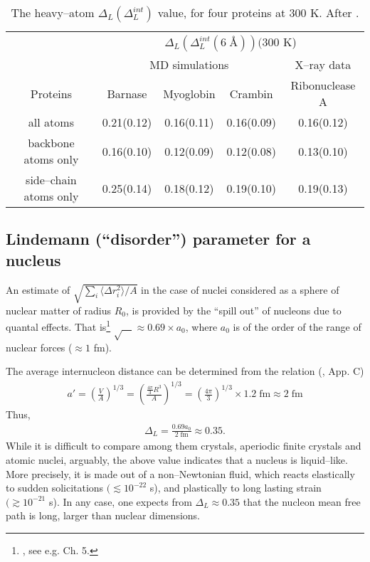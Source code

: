 \documentclass[a4paper,11pt]{book}
\begin{document}
\begin{table}[h]
 \begin{tabular}{|c|c|c|c|c|}
 \hline
 &\multicolumn{4}{|c|}{$\Delta_L(\Delta_L^{int}(6\;\text{\AA}))(300$ K)}\\
 \cline{2-5}
 &\multicolumn{3}{|c|}{MD simulations}&X--ray data\\
 \hline
 Proteins&Barnase&Myoglobin&Crambin&Ribonuclease A\\
 \hline
 all atoms&0.21(0.12)&0.16(0.11)&0.16(0.09)&0.16(0.12)\\
 backbone atoms only&0.16(0.10)&0.12(0.09)&0.12(0.08)&0.13(0.10)\\
 side--chain atoms only&0.25(0.14)&0.18(0.12)&0.19(0.10)&0.19(0.13)\\
 \hline
 \end{tabular}
 \caption{The heavy--atom $\Delta_L(\Delta_L^{int})$ value, for four proteins at 300 K. After \cite{Zhou:99}.}\label{tab2C1}
 \end{table}

\subsection*{Lindemann (``disorder'') parameter for a nucleus}
An estimate of  $\sqrt{\sum_i\langle \Delta r_i^2\rangle/A}$ in the case of nuclei considered as a sphere of nuclear matter of radius $R_0$, is provided by the ``spill out'' of nucleons due to quantal effects. That is\footnote{\cite{Bertsch:05}, see e.g. Ch. 5.} $\sqrt{\quad}\approx 0.69\times a_0$, where $a_0$ is of the order of the range of nuclear forces ($\approx 1$ fm).


The average internucleon distance can be determined from the relation (\cite{Brink:05}, App. C)
\begin{align}
a'=\left(\frac{V}{A}\right)^{1/3}=\left(\frac{\frac{4\pi}{3}R^3}{A}\right)^{1/3}=\left(\frac{4\pi}{3}\right)^{1/3}\times 1.2\; \text{fm}\approx 2\;\text{fm}
\end{align} 
Thus,
\begin{align}
\Delta_L=\frac{0.69 a_0}{2\;\text{fm}}\approx0.35.
\end{align} 
While it is difficult to compare among them crystals, aperiodic finite crystals and atomic nuclei, arguably, the above value indicates that a nucleus is liquid--like. More precisely, it is made out of a non--Newtonian fluid, which reacts elastically to sudden so\-li\-ci\-ta\-tions $(\lesssim 10^{-22}$ s),  and plastically to long lasting strain $(\gtrsim 10^{-21}$ s). In any case, one expects from $\Delta_L\approx 0.35$ that the nucleon mean free path is long, larger than nuclear dimensions.
\end{document}
